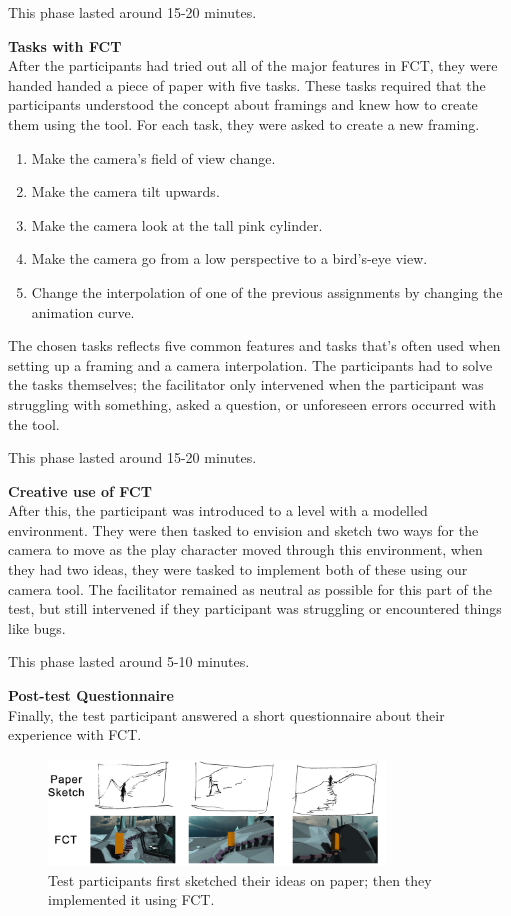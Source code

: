 This phase lasted around 15-20 minutes.

\textbf{Tasks with FCT}\\
After the participants had tried out all of the major features in FCT, they were handed handed a piece of paper with five tasks. These tasks required that the participants understood the concept about framings and knew how to create them using the tool. For each task, they were asked to create a new framing.

\begin{enumerate}
\item Make the camera's field of view change.
\item Make the camera tilt upwards.
\item Make the camera look at the tall pink cylinder.
\item Make the camera go from a low perspective to a bird's-eye view.
\item Change the interpolation of one of the previous assignments by changing the animation curve.
\end{enumerate} 

The chosen tasks reflects five common features and tasks that's often used when setting up a framing and a camera interpolation. The participants had to solve the tasks themselves; the facilitator only intervened when the participant was struggling with something, asked a question, or unforeseen errors occurred with the tool.

This phase lasted around 15-20 minutes.

\textbf{Creative use of FCT}\\
After this, the participant was introduced to a level with a modelled environment. They were then tasked to envision and sketch two ways for the camera to move as the play character moved through this environment, when they had two ideas, they were tasked to implement both of these using our camera tool. The facilitator remained as neutral as possible for this part of the test, but still intervened if they participant was struggling or encountered things like bugs.


This phase lasted around 5-10 minutes.

\textbf{Post-test Questionnaire}\\
Finally, the test participant answered a short questionnaire about their experience with FCT.

\begin{figure}[htbp]
\centering
\includegraphics[width=0.8\textwidth]{Pics/Sketching_Framings}
\caption{Test participants first sketched their ideas on paper; then they implemented it using FCT.}
\label{fig:Sketching_Framings}
\end{figure}
